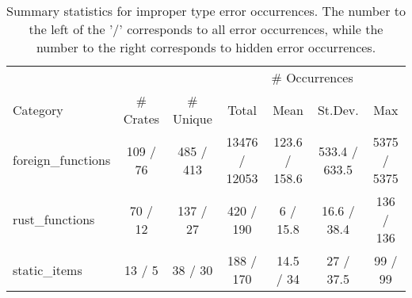 \begin{table}[ht]
\centering
\begin{tabular}{lcccccc}
  \hline
  & & & \multicolumn{4}{c}{# Occurrences} \\
 Category & # Crates & # Unique & Total & Mean & St.Dev. & Max \\
 \hline
foreign\_functions & 109 / 76 & 485 / 413 & 13476 / 12053 & 123.6 / 158.6 & 533.4 / 633.5 & 5375 / 5375 \\ 
  rust\_functions & 70 / 12 & 137 / 27 & 420 / 190 & 6 / 15.8 & 16.6 / 38.4 & 136 / 136 \\ 
  static\_items & 13 / 5 & 38 / 30 & 188 / 170 & 14.5 / 34 & 27 / 37.5 & 99 / 99 \\ 
   \hline
\end{tabular}
\caption{Summary statistics for improper type error occurrences. The number to the left of the '/' corresponds to all error occurrences, while the number to the right corresponds to hidden error occurrences.} 
\label{table:error_summary}
\end{table}
